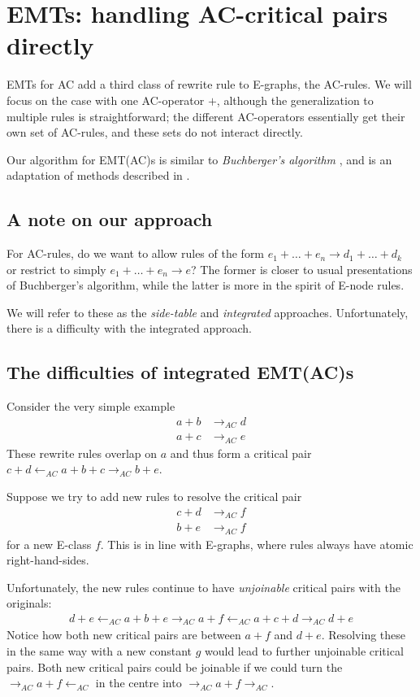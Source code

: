 \documentclass[12pt,a4paper,twoside,openright]{report}
\numberwithin{equation}{chapter}		%
\numberwithin{figure}{chapter}			%
\numberwithin{table}{chapter}			%
\theoremstyle{definition}
\theoremstyle{plain}
\begin{document}
\section{EMTs: handling AC-critical pairs directly}
EMTs for AC add a third class of rewrite rule to E-graphs, the AC-rules. We will focus on the case with one AC-operator $+$, although the generalization to multiple rules is straightforward; the different AC-operators essentially get their own set of AC-rules, and these sets do not interact directly.

Our algorithm for EMT(AC)s is similar to \emph{Buchberger's algorithm} \cite[Chapter~8]{baader_term_1998}, and is an adaptation of methods described in \cite{bachmair_abstract_2000, tiwari_decision_2000, kapur_modular_2021}.

\subsection{A note on our approach}
For AC-rules, do we want to allow rules of the form $e_1 + \ldots + e_n \rightarrow d_1 + \ldots + d_k$ or restrict to simply $e_1 + \ldots + e_n \rightarrow e$? The former is closer to usual presentations of Buchberger's algorithm, while the latter is more in the spirit of E-node rules.

We will refer to these as the \emph{side-table} and \emph{integrated} approaches. Unfortunately, there is a difficulty with the integrated approach.

\subsection{The difficulties of integrated EMT(AC)s}
Consider the very simple example
\begin{align*}
	a + b &\rightarrow_{AC} d \\
	a + c &\rightarrow_{AC} e
\end{align*}
These rewrite rules overlap on $a$ and thus form a critical pair $c + d \leftarrow_{AC} a + b + c \rightarrow_{AC} b + e$.

Suppose we try to add new rules to resolve the critical pair
\begin{align*}
	c + d &\rightarrow_{AC} f \\
	b + e &\rightarrow_{AC} f
\end{align*}
for a new E-class $f$. This is in line with E-graphs, where rules always have atomic right-hand-sides.

Unfortunately, the new rules continue to have \emph{unjoinable} critical pairs with the originals:
\begin{align*}
	d + e \leftarrow_{AC} a + b + e \rightarrow_{AC} a + f \leftarrow_{AC} a + c + d \rightarrow_{AC} d + e
\end{align*}
Notice how both new critical pairs are between $a + f$ and $d + e$. Resolving these in the same way with a new constant $g$ would lead to further unjoinable critical pairs. Both new critical pairs could be joinable if we could turn the $\rightarrow_{AC} a + f \leftarrow_{AC}$ in the centre into $\rightarrow_{AC} a + f \rightarrow_{AC}$.
\end{document}
